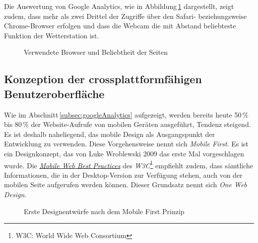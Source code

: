 \noindent
Die Auswertung von Google Analytics, wie in Abbildung\,\ref{img:google_browser} dargestellt, zeigt zudem, dass mehr als zwei Drittel der Zugriffe über den Safari- beziehungsweise Chrome-Browser erfolgen und dass die Webcam die mit Abstand beliebteste Funktion der Wetterstation ist.

\begin{figure}[htb!]
	\centering
	\caption{Verwendete Browser und Beliebtheit der Seiten}
	\label{img:google_browser}
\end{figure}



\subsection{Konzeption der crossplattformfähigen Benutzeroberfläche}
Wie im Abschnitt\,\ref{subsec:googleAnalytics} aufgezeigt, werden bereits heute 50\,\% bis 80\,\% der Website-Aufrufe von mobilen Geräten ausgeführt, Tendenz steigend. Es ist deshalb naheliegend, das mobile Design als Ausgangspunkt der Entwicklung zu verwenden. Diese Vorgehensweise nennt sich \emph{Mobile First}. Es ist ein Designkonzept, das von Luke Wroblewski 2009 das erste Mal vorgeschlagen wurde. Die \href{https://www.w3.org/TR/mobile-bp}{\emph{ Mobile Web Best Practices}} des \emph{W3C}\footnote{W3C: World Wide Web Consortium} empfiehlt zudem, dass sämtliche Informationen, die in der Desktop-Version zur Verfügung stehen, auch von der mobilen Seite aufgerufen werden können. Dieser Grundsatz nennt sich \emph{One Web Design}.

\begin{figure}[htb!]
	\centering
	\caption{Erste Designentwürfe nach dem Mobile First Prinzip}
	\label{img:scribbles}
\end{figure}


